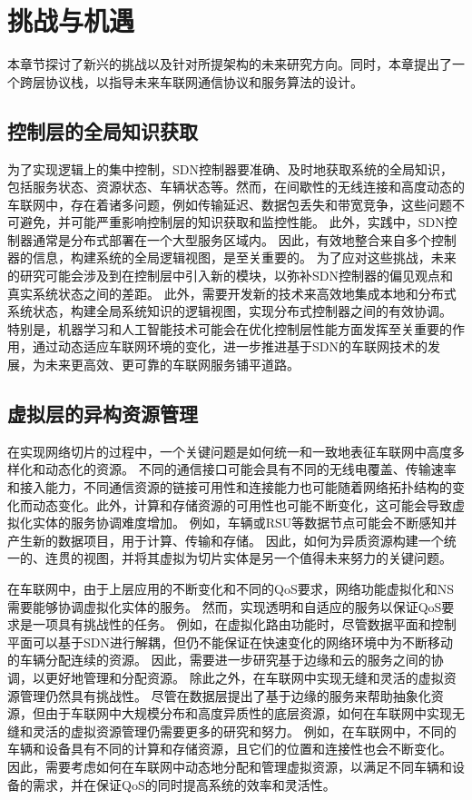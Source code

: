 \section{挑战与机遇}\label{section 2-3}

本章节探讨了新兴的挑战以及针对所提架构的未来研究方向。同时，本章提出了一个跨层协议栈，以指导未来车联网通信协议和服务算法的设计。

\subsection{控制层的全局知识获取}

为了实现逻辑上的集中控制，SDN控制器要准确、及时地获取系统的全局知识，包括服务状态、资源状态、车辆状态等。然而，在间歇性的无线连接和高度动态的车联网中，存在着诸多问题，例如传输延迟、数据包丢失和带宽竞争，这些问题不可避免，并可能严重影响控制层的知识获取和监控性能。
此外，实践中，SDN控制器通常是分布式部署在一个大型服务区域内。
因此，有效地整合来自多个控制器的信息，构建系统的全局逻辑视图，是至关重要的。
为了应对这些挑战，未来的研究可能会涉及到在控制层中引入新的模块，以弥补SDN控制器的偏见观点和真实系统状态之间的差距。
此外，需要开发新的技术来高效地集成本地和分布式系统状态，构建全局系统知识的逻辑视图，实现分布式控制器之间的有效协调。
特别是，机器学习和人工智能技术可能会在优化控制层性能方面发挥至关重要的作用，通过动态适应车联网环境的变化，进一步推进基于SDN的车联网技术的发展，为未来更高效、更可靠的车联网服务铺平道路。

\subsection{虚拟层的异构资源管理}

在实现网络切片的过程中，一个关键问题是如何统一和一致地表征车联网中高度多样化和动态化的资源。
不同的通信接口可能会具有不同的无线电覆盖、传输速率和接入能力，不同通信资源的链接可用性和连接能力也可能随着网络拓扑结构的变化而动态变化。此外，计算和存储资源的可用性也可能不断变化，这可能会导致虚拟化实体的服务协调难度增加。
例如，车辆或RSU等数据节点可能会不断感知并产生新的数据项目，用于计算、传输和存储。
因此，如何为异质资源构建一个统一的、连贯的视图，并将其虚拟为切片实体是另一个值得未来努力的关键问题。

在车联网中，由于上层应用的不断变化和不同的QoS要求，网络功能虚拟化和NS需要能够协调虚拟化实体的服务。
然而，实现透明和自适应的服务以保证QoS要求是一项具有挑战性的任务。
例如，在虚拟化路由功能时，尽管数据平面和控制平面可以基于SDN进行解耦，但仍不能保证在快速变化的网络环境中为不断移动的车辆分配连续的资源。
因此，需要进一步研究基于边缘和云的服务之间的协调，以更好地管理和分配资源。
除此之外，在车联网中实现无缝和灵活的虚拟资源管理仍然具有挑战性。
尽管在数据层提出了基于边缘的服务来帮助抽象化资源，但由于车联网中大规模分布和高度异质性的底层资源，如何在车联网中实现无缝和灵活的虚拟资源管理仍需要更多的研究和努力。
例如，在车联网中，不同的车辆和设备具有不同的计算和存储资源，且它们的位置和连接性也会不断变化。
因此，需要考虑如何在车联网中动态地分配和管理虚拟资源，以满足不同车辆和设备的需求，并在保证QoS的同时提高系统的效率和灵活性。

